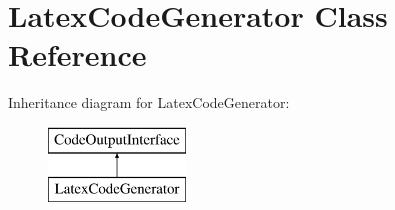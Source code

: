 \hypertarget{class_latex_code_generator}{}\section{Latex\+Code\+Generator Class Reference}
\label{class_latex_code_generator}
Inheritance diagram for Latex\+Code\+Generator\+:\begin{figure}[H]
\begin{center}
\leavevmode
\includegraphics[height=2.000000cm]{class_latex_code_generator}
\end{center}
\end{figure}
